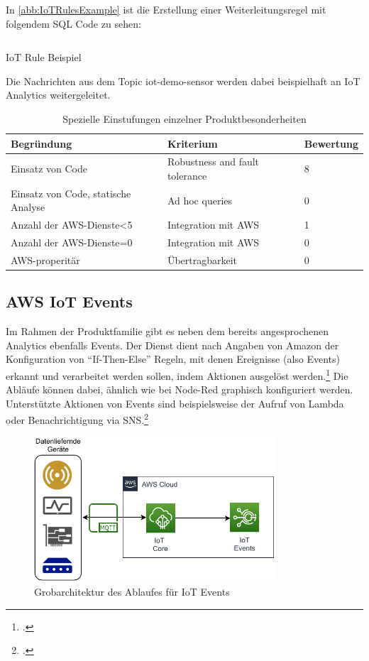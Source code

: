 In \autoref{abb:IoTRulesExample} ist die Erstellung einer Weiterleitungsregel mit folgendem SQL Code zu sehen:
\begin{listing}[H]
\inputminted[frame=lines,breaklines=true]{sql}{code/iot-rules-example.sql}
\caption{IoT Rule Beispiel}
\label{listing:iot-rule-example}
\end{listing}
Die Nachrichten aus dem Topic iot-demo-sensor werden dabei beispielhaft an IoT Analytics weitergeleitet.

\begin{table}[H]
\centering
\begin{tabular}{|l|l|l|}
\hline
\rowcolor[HTML]{ECF4FF} 
Begründung & Kriterium & Bewertung \\ \hline
Einsatz von Code & Robustness and fault tolerance & 8 \\ \hline
Einsatz von Code, statische Analyse & Ad hoc queries & 0 \\ \hline
Anzahl der AWS-Dienste\textless{}5 & Integration mit AWS & 1 \\ \hline
Anzahl der AWS-Dienste=0 & Integration mit AWS & 0 \\ \hline
AWS-properitär & Übertragbarkeit & 0 \\ \hline
\end{tabular}
\caption{Spezielle Einstufungen einzelner Produktbesonderheiten}
\label{tab:einstufungen}
\end{table}



\subsection{AWS IoT Events}




Im Rahmen der \AWSIOT Produktfamilie gibt es neben dem bereits angesprochenen \AWSIOT Analytics ebenfalls \AWSIOT Events.  
Der Dienst dient nach Angaben von Amazon der Konfiguration von \enquote{If-Then-Else} Regeln, mit denen Ereignisse (also Events) erkannt und verarbeitet werden sollen, indem Aktionen ausgelöst werden.\footcite[Vgl.][]{AmazonWebServicesInc..o.J.b} Die Abläufe können dabei, ähnlich wie bei Node-Red graphisch konfiguriert werden. Unterstützte Aktionen von \AWSIOT Events sind beispielsweise der Aufruf von Lambda oder Benachrichtigung via \ac{SNS}.\footcite[Vgl.][]{AmazonWebServicesInc..o.J.ao}
\begin{figure}[H]
\centering
\includegraphics[width=0.8\textwidth]{graphics/IoT-Events-general.pdf}
\caption{Grobarchitektur des Ablaufes für IoT Events}
\label{abb:GrobArchitekturIoTEvents}
\end{figure}

